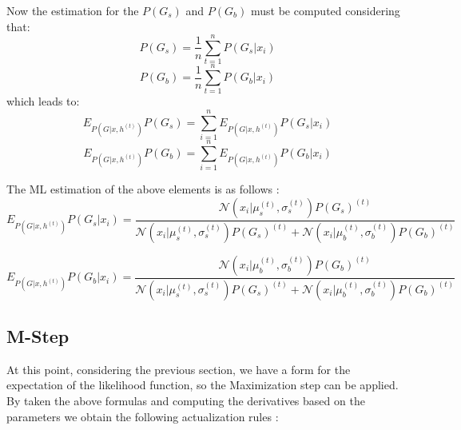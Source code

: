 Now the estimation for the $P(G_s)$ and $P(G_b)$ must be computed considering that:
$$P(G_s) = \frac{1}{n} \sum_{t = 1}^{n}P(G_s | x_i)$$
$$P(G_b) = \frac{1}{n} \sum_{t = 1}^{n}P(G_b | x_i)$$
which leads to:
$$E_{P(G | x, h^{(t)})} P(G_s) = \sum_{i=1}^{n} E_{P(G | x, h^{(t)})} P(G_s | x_i) $$
$$E_{P(G | x, h^{(t)})} P(G_b) = \sum_{i=1}^{n} E_{P(G | x, h^{(t)})} P(G_b | x_i) $$

The ML estimation of the above elements is as follows \cite{EMObjectConcealement}:
$$E_{P(G | x, h^{(t)})} P(G_s | x_i) = \frac{\mathcal{N}(x_i | \mu_s^{(t)}, \sigma_s^{(t)}) P(G_s)^{(t)}}{\mathcal{N}(x_i | \mu_s^{(t)}, \sigma_s^{(t)}) P(G_s)^{(t)} + \mathcal{N}(x_i | \mu_b^{(t)}, \sigma_b^{(t)}) P(G_b)^{(t)}}	$$

$$E_{P(G | x, h^{(t)})} P(G_b | x_i) = \frac{\mathcal{N}(x_i | \mu_b^{(t)}, \sigma_b^{(t)}) P(G_b)^{(t)}}{\mathcal{N}(x_i | \mu_s^{(t)}, \sigma_s^{(t)}) P(G_s)^{(t)} + \mathcal{N}(x_i | \mu_b^{(t)}, \sigma_b^{(t)}) P(G_b)^{(t)}}	$$

\subsection{M-Step}
At this point, considering the previous section, we have a form for the expectation of the likelihood function, so the Maximization step can be applied. By taken the above formulas and computing the derivatives based on the parameters we obtain the following actualization rules \cite{EMObjectConcealement}: \\

